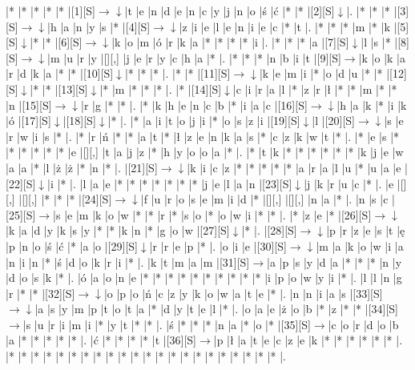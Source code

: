 \documentclass[11pt]{article}
\newcommand\drarr{$\rightarrow \!\!\!\!\! \downarrow$}
\newcommand\rarr{$\rightarrow$}
\newcommand\darr{$\downarrow$}
\begin{document}
\noindent\begin{Puzzle}{21}{26}|*	|*	|*	|*	|*	|[1][S]\drarr	|t	|e	|n	|d	|e	|n	|c	|y	|j	|n	|o	|ś	|ć	|*	|*	|[2][S]\darr	|.
|*	|*	|*	|[3][S]\drarr	|h	|a	|n	|y	|s	|*	|[4][S]\drarr	|z	|i	|e	|l	|e	|n	|i	|e	|c	|*	|t	|.
|*	|*	|*	|m	|*	|k	|[5][S]\darr	|*	|*	|[6][S]\drarr	|k	|o	|m	|ó	|r	|k	|a	|*	|*	|*	|*	|i	|.
|*	|*	|*	|a	|[7][S]\darr	|l	|s	|*	|[8][S]\drarr	|m	|u	|r	|y	|[][,]{ }	|j	|e	|r	|y	|c	|h	|a	|*	|.
|*	|*	|*	|n	|b	|i	|t	|[9][S]\rarr	|k	|o	|k	|a	|r	|d	|k	|a	|*	|*	|[10][S]\darr	|*	|*	|*	|.
|*	|*	|[11][S]\drarr	|k	|e	|m	|i	|*	|o	|d	|u	|*	|*	|[12][S]\darr	|*	|*	|[13][S]\darr	|*	|m	|*	|*	|*	|.
|*	|[14][S]\darr	|c	|i	|r	|a	|l	|*	|z	|r	|ł	|*	|*	|m	|*	|*	|n	|[15][S]\drarr	|r	|g	|*	|*	|.
|*	|k	|h	|e	|n	|c	|b	|*	|i	|a	|c	|[16][S]\drarr	|h	|a	|k	|*	|i	|k	|ó	|[17][S]\darr	|[18][S]\darr	|*	|.
|*	|a	|i	|t	|o	|j	|i	|*	|o	|s	|z	|i	|[19][S]\darr	|l	|[20][S]\drarr	|s	|e	|r	|w	|i	|s	|*	|.
|*	|r	|ń	|*	|*	|a	|t	|*	|ł	|z	|e	|n	|k	|a	|s	|*	|c	|z	|k	|w	|t	|*	|.
|*	|e	|s	|*	|*	|*	|*	|*	|*	|e	|[][,]{ }	|t	|a	|j	|z	|*	|h	|y	|o	|o	|a	|*	|.
|*	|t	|k	|*	|*	|*	|*	|*	|*	|k	|j	|e	|w	|a	|a	|*	|l	|ż	|ż	|*	|n	|*	|.
|[21][S]\drarr	|k	|i	|c	|z	|*	|*	|*	|*	|*	|a	|r	|a	|l	|u	|*	|u	|a	|e	|[22][S]\darr	|i	|*	|.
|l	|a	|e	|*	|*	|*	|*	|*	|*	|*	|j	|e	|l	|a	|n	|[23][S]\darr	|j	|k	|r	|u	|c	|*	|.
|e	|[][,]{ }	|[][,]{ }	|*	|*	|*	|[24][S]\drarr	|f	|u	|r	|o	|s	|e	|m	|i	|d	|*	|[][,]{ }	|[][,]{ }	|n	|a	|*	|.
|n	|s	|c	|[25][S]\rarr	|s	|e	|m	|k	|o	|w	|*	|*	|r	|*	|s	|o	|*	|o	|w	|i	|*	|*	|.
|*	|z	|e	|*	|[26][S]\drarr	|k	|a	|d	|y	|k	|s	|y	|*	|*	|k	|n	|*	|g	|o	|w	|[27][S]\darr	|*	|.
|[28][S]\drarr	|p	|r	|z	|e	|s	|t	|ę	|p	|n	|o	|ś	|ć	|*	|a	|o	|[29][S]\darr	|r	|r	|e	|p	|*	|.
|o	|i	|e	|[30][S]\drarr	|m	|a	|k	|o	|w	|i	|a	|n	|i	|n	|*	|ś	|d	|o	|k	|r	|i	|*	|.
|k	|t	|m	|a	|m	|[31][S]\rarr	|a	|p	|s	|y	|d	|a	|*	|*	|*	|n	|y	|d	|o	|s	|k	|*	|.
|ó	|a	|o	|n	|e	|*	|*	|*	|*	|*	|*	|*	|*	|*	|*	|i	|p	|o	|w	|y	|i	|*	|.
|l	|l	|n	|g	|r	|*	|*	|[32][S]\drarr	|o	|p	|o	|ń	|c	|z	|y	|k	|o	|w	|a	|t	|e	|*	|.
|n	|n	|i	|a	|s	|[33][S]\drarr	|a	|s	|y	|m	|p	|t	|o	|t	|a	|*	|d	|y	|t	|e	|l	|*	|.
|o	|a	|e	|ż	|o	|b	|*	|z	|*	|*	|[34][S]\rarr	|s	|u	|r	|i	|m	|i	|*	|y	|t	|*	|*	|.
|ś	|*	|*	|*	|n	|a	|*	|o	|*	|[35][S]\rarr	|c	|o	|r	|d	|o	|b	|a	|*	|*	|*	|*	|*	|.
|ć	|*	|*	|*	|*	|t	|[36][S]\rarr	|p	|ł	|a	|t	|e	|c	|z	|e	|k	|*	|*	|*	|*	|*	|*	|.
|*	|*	|*	|*	|*	|*	|*	|*	|*	|*	|*	|*	|*	|*	|*	|*	|*	|*	|*	|*	|*	|*	|.\end{Puzzle}

\newpage
\end{document}
